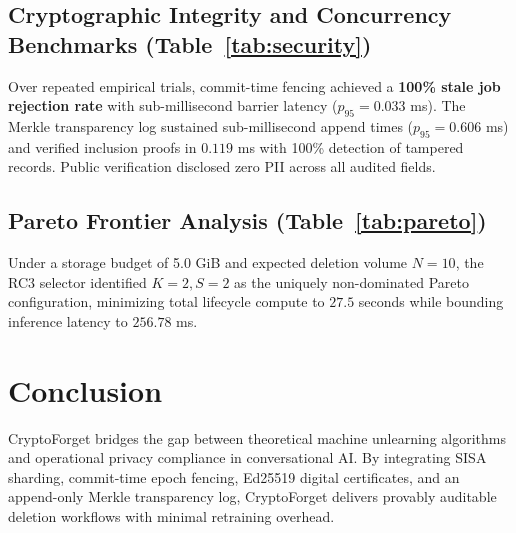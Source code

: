 \documentclass[10pt,journal,compsoc]{IEEEtran}
\begin{document}
\subsection{Cryptographic Integrity and Concurrency Benchmarks (Table~\ref{tab:security})}
Over repeated empirical trials, commit-time fencing achieved a \textbf{100\% stale job rejection rate} with sub-millisecond barrier latency ($p_{95} = 0.033$ ms). The Merkle transparency log sustained sub-millisecond append times ($p_{95} = 0.606$ ms) and verified inclusion proofs in $0.119$ ms with 100\% detection of tampered records. Public verification disclosed zero PII across all audited fields.

\subsection{Pareto Frontier Analysis (Table~\ref{tab:pareto})}
Under a storage budget of 5.0 GiB and expected deletion volume $N=10$, the RC3 selector identified \textbf{$K=2, S=2$} as the uniquely non-dominated Pareto configuration, minimizing total lifecycle compute to $27.5$ seconds while bounding inference latency to $256.78$ ms.

\section{Conclusion}
CryptoForget bridges the gap between theoretical machine unlearning algorithms and operational privacy compliance in conversational AI. By integrating SISA sharding, commit-time epoch fencing, Ed25519 digital certificates, and an append-only Merkle transparency log, CryptoForget delivers provably auditable deletion workflows with minimal retraining overhead.



\end{document}
